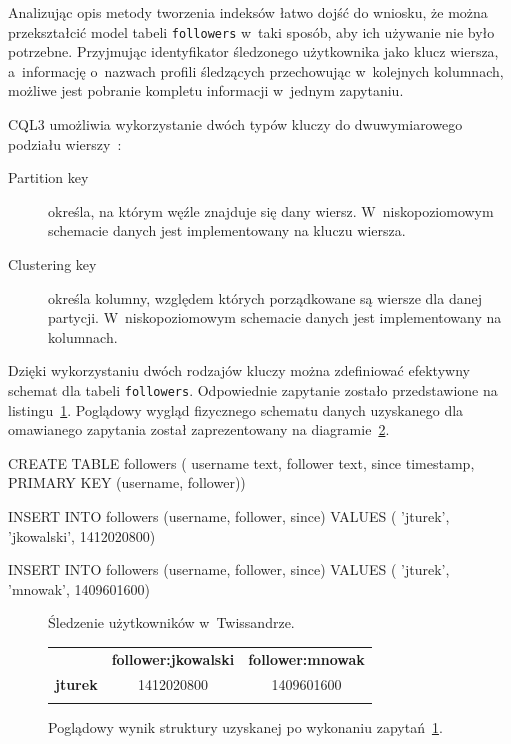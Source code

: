 Analizując opis metody tworzenia indeksów łatwo dojść do wniosku, że można przekształcić model tabeli \verb+followers+ w~taki sposób, aby ich używanie nie było potrzebne. Przyjmując identyfikator śledzonego użytkownika jako klucz wiersza, a~informację o~nazwach profili śledzących przechowując w~kolejnych kolumnach, możliwe jest pobranie kompletu informacji w~jednym zapytaniu. 

CQL3 umożliwia wykorzystanie dwóch typów kluczy do dwuwymiarowego podziału wierszy~\cite{compound_keys_and_clustering}:

\begin{description}
	\item[Partition key] określa, na którym węźle znajduje się dany wiersz. W~niskopoziomowym schemacie danych jest implementowany na kluczu wiersza.
	\item[Clustering key] określa kolumny, względem których porządkowane są wiersze dla danej partycji. W~niskopoziomowym schemacie danych jest implementowany na kolumnach.
\end{description}

Dzięki wykorzystaniu dwóch rodzajów kluczy można zdefiniować efektywny schemat dla tabeli \verb+followers+. Odpowiednie zapytanie zostało przedstawione na listingu~\ref{lst:following_users}. Poglądowy wygląd fizycznego schematu danych uzyskanego dla omawianego zapytania został zaprezentowany na diagramie~\ref{tab:following_users_structure}.

\begin{verbbox}
CREATE TABLE followers (
    username text,
    follower text,
    since timestamp,
    PRIMARY KEY (username, follower))

INSERT INTO followers (username, follower, since) VALUES (
    'jturek',
    'jkowalski',
    1412020800)

INSERT INTO followers (username, follower, since) VALUES (
    'jturek',
    'mnowak',
    1409601600)
\end{verbbox}

\begin{figure}[ht!]
	\centering
	\theverbbox
	\caption{Śledzenie użytkowników w~Twissandrze.}
	\label{lst:following_users}
\end{figure}

\begin{figure}[ht!]
	\centering
	\begin{tabular}{|l||c|c|}
		\hhline{|-||--|}
		& \textbf{follower:jkowalski} & \textbf{follower:mnowak} \\
		\hhline{|~||==|}
		\textbf{jturek} & 1412020800 & 1409601600 \\
		\hhline{|-||--|}
	\end{tabular} 

	\caption{Poglądowy wynik struktury uzyskanej po wykonaniu zapytań~\ref{lst:following_users}.}
	\label{tab:following_users_structure}
\end{figure}

